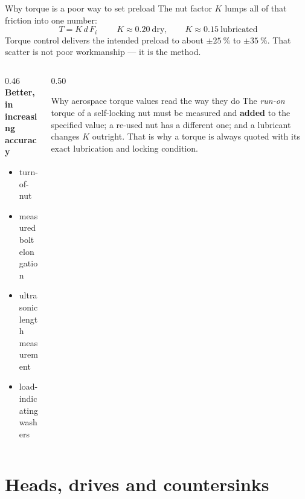 \documentclass[aspectratio=169,10pt]{beamer}
\begin{document}
\begin{frame}{Why torque is a poor way to set preload}
The nut factor $K$ lumps all of that friction into one number:
\[
\boxed{\;T = K\,d\,F_i\;}\qquad K \approx 0.20 \ \text{dry}, \qquad K \approx 0.15 \ \text{lubricated}
\]
\vfill
Torque control delivers the intended preload to about \alert{$\pm\SI{25}{\percent}$ to
$\pm\SI{35}{\percent}$}. That scatter is not poor workmanship --- it is the method.
\vfill
\begin{columns}[T]
\begin{column}{0.46\textwidth}
\textbf{Better, in increasing accuracy}
\begin{itemize}\footnotesize
  \item turn-of-nut
  \item measured bolt elongation
  \item ultrasonic length measurement
  \item load-indicating washers
\end{itemize}
\end{column}
\begin{column}{0.50\textwidth}
\begin{alertblock}{\small Why aerospace torque values read the way they do}
\footnotesize The \emph{run-on} torque of a self-locking nut must be measured and \textbf{added} to
the specified value; a re-used nut has a different one; and a lubricant changes $K$ outright. That is
why a torque is always quoted with its exact lubrication and locking condition.
\end{alertblock}
\end{column}
\end{columns}
\end{frame}

\section{Heads, drives and countersinks}
\end{document}
